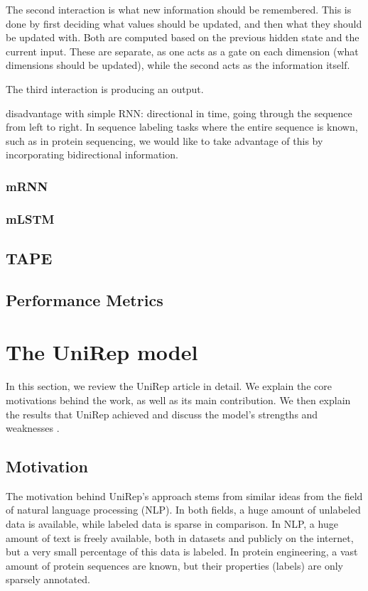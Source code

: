 \documentclass[a4paper,12pt]{article}
\begin{document}
The second interaction is what new information should be remembered. This is done by first deciding what values should be updated, and then what they should be updated with. Both are computed based on the previous hidden state and the current input. These are separate, as one acts as a gate on each dimension (what dimensions should be updated), while the second acts as the information itself.


The third interaction is producing an output. 

 disadvantage with simple RNN: directional in time, going through the sequence from left to right. In sequence labeling tasks where the entire sequence is known, such as in protein sequencing, we would like to take advantage of this by incorporating bidirectional information.

\subsubsection{mRNN}
\subsubsection{mLSTM}

\subsection{TAPE}
\subsection{Performance Metrics}

\clearpage
\section{The UniRep model}
In this section, we review the UniRep article in detail. We explain the core motivations behind the work, as well as its main contribution. We then explain the results that UniRep achieved and discuss the model's strengths and weaknesses .

\subsection{Motivation}
The motivation behind UniRep's approach stems from similar ideas from the field of natural language processing (NLP). In both fields, a huge amount of unlabeled data is available, while labeled data is sparse in comparison. In NLP, a huge amount of text is freely available, both in datasets and publicly on the internet, but a very small percentage of this data is labeled. In protein engineering, a vast amount of protein sequences are known, but their properties (labels) are only sparsely annotated.
\end{document}

